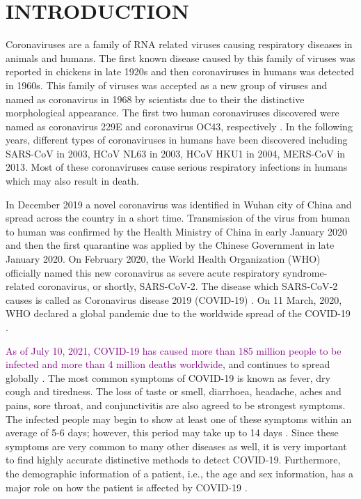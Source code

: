 \chapter{INTRODUCTION}
\label{ch:CH1}

Coronaviruses are a family of RNA related viruses causing respiratory diseases in animals and humans. The first known disease caused by this family of viruses was reported in chickens in late 1920s and then coronaviruses in humans was detected in 1960s. This family of viruses was accepted as a new group of viruses and named as coronavirus in 1968 by scientists due to their the distinctive morphological appearance. The first two human coronaviruses discovered were named as coronavirus 229E and coronavirus OC43, respectively \cite{history_coronavirus}. In the following years, different types of coronaviruses in humans have been discovered including SARS-CoV in 2003, HCoV NL63 in 2003, HCoV HKU1 in 2004, MERS-CoV in 2013. Most of these coronaviruses cause serious respiratory infections in humans which may also result in death.


In December 2019 a novel coronavirus was identified in Wuhan city of China and spread across the country in a short time. Transmission of the virus from human to human was confirmed by the Health Ministry of China in early January 2020 and then the first quarantine was applied by the Chinese Government in late January 2020. On February 2020, the World Health Organization (WHO) officially named this new coronavirus as severe acute respiratory syndrome-related coronavirus, or shortly, SARS-CoV-2. The disease which SARS‑CoV‑2 causes is called as Coronavirus disease 2019 (COVID-19) \cite{coronavirus_species}. On 11 March, 2020,  WHO declared a global pandemic due to the worldwide spread of the COVID-19 \cite{who_pandemic_declaration}.

\textcolor{purple}{As of July 10, 2021, COVID-19 has caused more than 185 million people to be infected and more than 4 million deaths worldwide}, and continues to spread globally \cite{covid19_news}. The most common symptoms of COVID-19 is known as fever, dry cough and tiredness. The loss of taste or smell, diarrhoea, headache, aches and pains, sore throat, and conjunctivitis are also agreed to be strongest symptoms. The infected people may begin to show at least one of these symptoms within an average of 5-6 days; however, this period may take up to 14 days \cite{who_qa}. Since these symptoms are very common to many other diseases as well, it is very important to find highly accurate distinctive methods to detect COVID-19. Furthermore, the demographic information of a patient, i.e., the age and sex information, has a major role on how the patient is affected by COVID-19 \cite{effect_of_demographicInfo}. 

